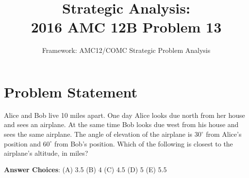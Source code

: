 \documentclass[12pt]{article}
\title{\textbf{Strategic Analysis:\\2016 AMC 12B Problem 13}}
\author{Framework: AMC12/COMC Strategic Problem Analysis}
\date{}
\begin{document}
\maketitle

\section*{Problem Statement}
Alice and Bob live 10 miles apart. One day Alice looks due north from her house and sees an airplane. At the same time Bob looks due west from his house and sees the same airplane. The angle of elevation of the airplane is $30^\circ$ from Alice's position and $60^\circ$ from Bob's position. Which of the following is closest to the airplane's altitude, in miles?

\textbf{Answer Choices}: (A) 3.5 \quad (B) 4 \quad (C) 4.5 \quad (D) 5 \quad (E) 5.5
\end{document}
